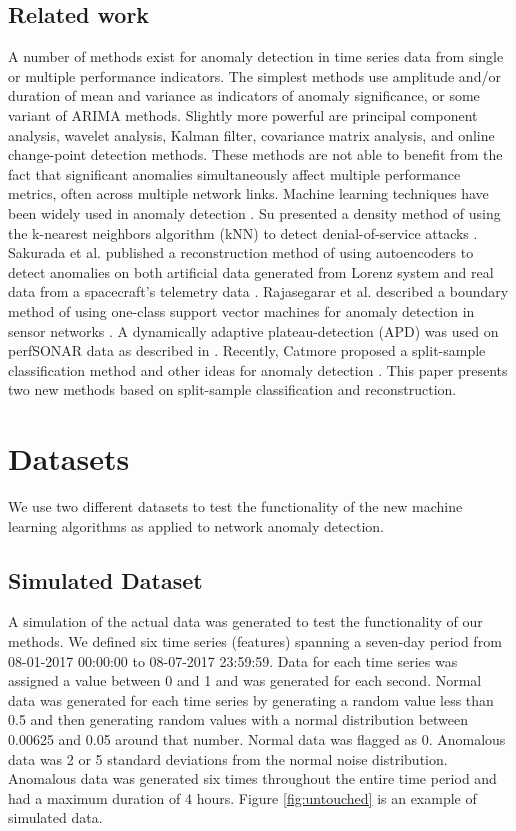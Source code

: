 \documentclass[5p]{elsarticle}
\begin{document}
\subsection{Related work}

A number of methods exist for anomaly detection in time series data from single or multiple performance indicators. The simplest methods use amplitude and/or duration of mean and variance as indicators of anomaly significance, or some variant of ARIMA methods. Slightly more powerful are principal component analysis, wavelet analysis, Kalman filter, covariance matrix analysis, and online change-point detection methods. These methods are not able to benefit from the fact that significant anomalies simultaneously affect multiple performance metrics, often across multiple network links. Machine learning techniques have been widely used in anomaly detection \cite{dva}. Su presented a density method of using the k-nearest neighbors algorithm (kNN) to detect denial-of-service attacks \cite{tri}. Sakurada et al. published a reconstruction method of using autoencoders to detect anomalies on both artificial data generated from Lorenz system and real data from a spacecraft’s telemetry data \cite{cetiri}. Rajasegarar et al. described a boundary method of using one-class support vector machines for anomaly detection in sensor networks \cite{pet}. A dynamically adaptive plateau-detection (APD) was used on perfSONAR data as described in \cite{dvanaest}. Recently, Catmore proposed a split-sample classification method and other ideas for anomaly detection \cite{sest}. This paper presents two new methods based on split-sample classification and reconstruction. 

\section{Datasets}

We use two different datasets to test the functionality of the new machine learning algorithms as applied to network anomaly detection. 

\subsection{Simulated Dataset}

A simulation of the actual data was generated to test the functionality of our methods. We defined six time series (features) spanning a seven-day period from 08-01-2017 00:00:00 to 08-07-2017 23:59:59. Data for each time series was assigned a value between 0 and 1 and was generated for each second. Normal data was generated for each time series by generating a random value less than 0.5 and then generating random values with a normal distribution between 0.00625 and 0.05 around that number. Normal data was flagged as 0. Anomalous data was 2 or 5 standard deviations from the normal noise distribution. Anomalous data was generated six times throughout the entire time period and had a maximum duration of 4 hours. Figure \ref{fig:untouched} is an example of simulated data. 
\end{document}
